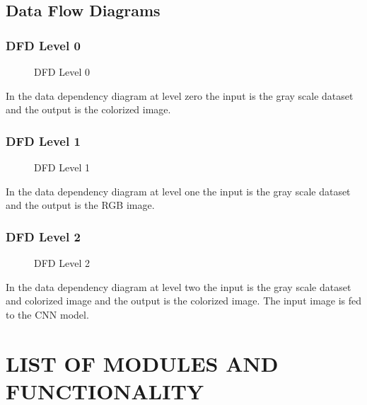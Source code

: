\documentclass[12pt]{report}	%
\newcommand{\squeezeup}{\vspace{-0.6cm}}
\begin{document}
\section{Data Flow Diagrams}

\subsection{DFD Level 0}
	\begin{figure}[!h]
		\captionsetup{font=scriptsize}
		\begin{center}
			{}
			\caption{DFD Level 0}
			\label{fig:7}
		\end{center}
		\squeezeup
	\end{figure}
	 In the data dependency diagram at level zero the input is the gray scale dataset and the output is the colorized image.

\subsection{DFD Level 1}
	\begin{figure}[!h]
		\captionsetup{font=scriptsize}
		\begin{center}
			{}
			\caption{DFD Level 1}
			\label{fig:7}
		\end{center}
		\squeezeup
	\end{figure}
	 In the data dependency diagram at level one the input is the gray scale dataset and the output is the RGB image. 
	\subsection{DFD Level 2}
	\begin{figure}[!h]
		\captionsetup{font=scriptsize}
		\begin{center}
			{}
			\caption{DFD Level 2}
			\label{fig:8}
		\end{center}
		\squeezeup
	\end{figure}
In the data dependency diagram at level two the input is the gray scale dataset and colorized image and the output is the colorized image. The input image is fed to the CNN model.

\chapter{LIST OF MODULES AND FUNCTIONALITY}
\end{document}
